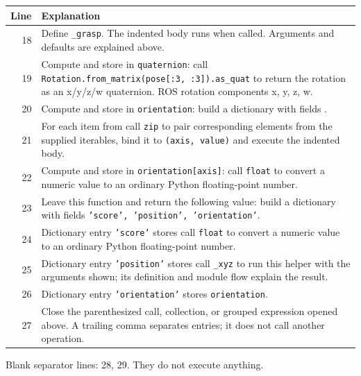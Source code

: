 \documentclass[11pt,a4paper]{book}
\begin{document}
\begin{longtable}{r p{}}

\textbf{Line} & \textbf{Explanation} \\ \hline \endhead

18 & Define \texttt{\_grasp}. The indented body runs when called. Arguments and defaults are explained above. \\

19 & Compute and store in \texttt{quaternion}: call \texttt{Rotation.from\_matrix(pose[:3, :3]).as\_quat} to return the rotation as an x/y/z/w quaternion. ROS rotation components x, y, z, w. \\

20 & Compute and store in \texttt{orientation}: build a dictionary with fields \texttt{}.  \\

21 & For each item from call \texttt{zip} to pair corresponding elements from the supplied iterables, bind it to \texttt{(axis, value)} and execute the indented body. \\

22 & Compute and store in \texttt{orientation[axis]}: call \texttt{float} to convert a numeric value to an ordinary Python floating-point number.  \\

23 & Leave this function and return the following value: build a dictionary with fields \texttt{'score', 'position', 'orientation'}. \\

24 & Dictionary entry \texttt{'score'} stores call \texttt{float} to convert a numeric value to an ordinary Python floating-point number. \\

25 & Dictionary entry \texttt{'position'} stores call \texttt{\_xyz} to run this helper with the arguments shown; its definition and module flow explain the result. \\

26 & Dictionary entry \texttt{'orientation'} stores \texttt{orientation}. \\

27 & Close the parenthesized call, collection, or grouped expression opened above. A trailing comma separates entries; it does not call another operation. \\

\end{longtable}

Blank separator lines: 28, 29. They do not execute anything.
\end{document}
